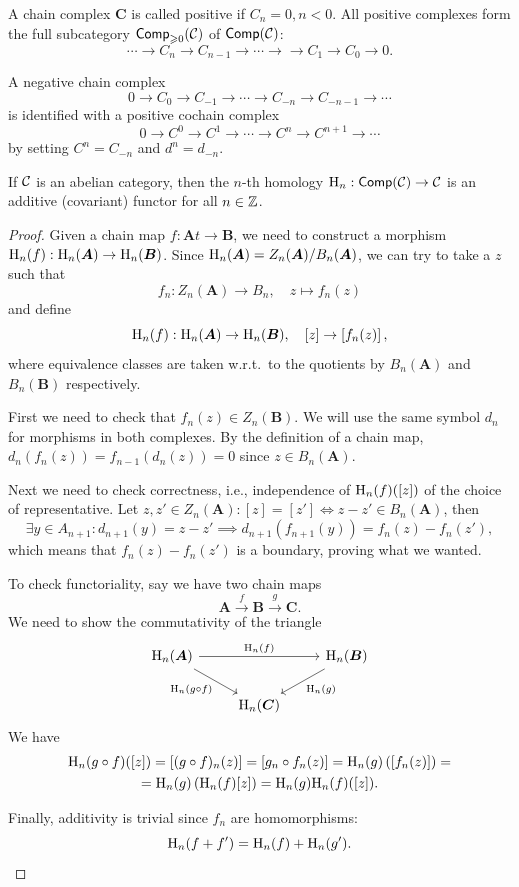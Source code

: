 \begin{defn}
    A chain complex $\bm{C}$ is called positive if $C_n=0,n<0$. All positive complexes form the full subcategory $\mathsf{Comp}_{\geqslant 0} (\mathcal{C})$ of $\mathsf{Comp}(\mathcal{C})$:
    \[\cdots\to C_n\to C_{n-1}\to\cdots\to \to C_1\to C_0\to 0.\]
    
    A negative chain complex
    \[0\to C_0\to C_{-1}\to \cdots \to C_{-n}\to C_{-n-1}\to\cdots\]
    is identified with a positive cochain complex 
    \[0\to C^0\to C^{1}\to \cdots \to C^{n}\to C^{n+1}\to\cdots\]
    by setting $C^n=C_{-n}$ and $d^n=d_{-n}$.
\end{defn}

\begin{prop}
    If $\mathcal{C}$ is an abelian category, then the $n$-th homology $\mathrm{H}_n:\mathsf{Comp}(\mathcal{C})\to \mathcal{C}$ is an additive (covariant) functor for all $n\in \mathbb{Z}$.
\end{prop}
\begin{proof}
    Given a chain map $f:\bm{A}t\to \bm{B}$, we need to construct a morphism $\mathrm{H}_n(f):\mathrm{H}_n(\boldsymbol{A})\to \mathrm{H}_n(\boldsymbol{B})$. Since $\mathrm{H}_n(\boldsymbol{A})=Z_n(\boldsymbol{A})/B_n(\boldsymbol{A})$, we can try to take a $z$ such that
    \[f_n:Z_n(\bm{A})\to B_n,\quad z\mapsto f_n(z)\]
    and define
    \[\mathrm{H}_n(f):\mathrm{H}_n(\boldsymbol{A})\to \mathrm{H}_n(\boldsymbol{B}),\quad [z]\to \left[f_n(z)\right],\]
    where equivalence classes are taken w.r.t.\ to the quotients by $B_n(\bm{A})$ and $B_n(\bm{B})$ respectively.
    
    First we need to check that $f_n(z)\in Z_n(\bm{B})$. We will use the same symbol $d_n$ for morphisms in both complexes. By the definition of a chain map, $d_n(f_n(z))=f_{n-1}(d_n(z))=0$ since $z\in B_n(\bm{A})$.
    
    Next we need to check correctness, i.e., independence of $\mathrm{H}_n(f)([z])$ of the choice of representative. Let $z,z'\in Z_n(\bm{A}):[z]=[z']\Leftrightarrow z-z'\in B_n(\bm{A})$, then
    \[\exists y\in A_{n+1}: d_{n+1}(y)=z-z'\implies d_{n+1}(f_{n+1}(y))=f_n(z)-f_n(z'),\]
    which means that $f_n(z)-f_n(z')$ is a boundary, proving what we wanted.
    
    To check functoriality, say we have two chain maps
    \[\bm{A}\overset f\to \bm{B}\overset g\to \bm{C}.\]
    We need to show the commutativity of the triangle
    \[
    \begin{tikzcd}
        \rmH_n(\bm{A}) \arrow[rr,"\rmH_n(f)"]\arrow[dr,swap,"\rmH_n(g\circ f)"]&& \rmH_n(\bm{B})\arrow[dl,"\rmH_n(g)"]\\
        & \rmH_n(\bm{C}) &
    \end{tikzcd}
    \]
    We have 
    \begin{multline}
        \mathrm{H}_n(g\circ f)([z])=\left[(g\circ f)_n(z)\right]=\left[g_n\circ f_n(z)\right]=\mathrm{H}_n(g)\left(\left[f_n(z)\right]\right)=\\=\mathrm{H}_n(g)\left(\mathrm{H}_n(f)[z]\right)=\mathrm{H}_n(g)\mathrm{H}_n(f)([z]).
    \end{multline}
    
    Finally, additivity is trivial since $f_n$ are homomorphisms:
    \[\mathrm{H}_n(f+f')=\mathrm{H}_n(f)+\mathrm{H}_n(g').\]
\end{proof}

